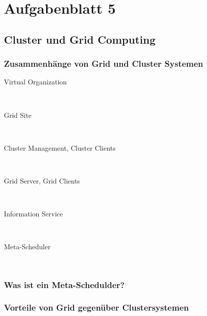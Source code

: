 \section{Aufgabenblatt 5}
\subsection{Cluster und Grid Computing}

	\subsubsection{Zusammenhänge von Grid und Cluster Systemen}
		\begin{description}
			\item[Virtual Organization]\hfill \\
			\item[Grid Site]\hfill \\
			\item[Cluster Management, Cluster Clients]\hfill \\
			\item[Grid Server, Grid Clients]\hfill \\
			\item[Information Service]\hfill \\
			\item[Meta-Scheduler]\hfill \\
		\end{description}

	\subsubsection{Was ist ein Meta-Schedulder?}
	\subsubsection{Vorteile von Grid gegenüber Clustersystemen}
